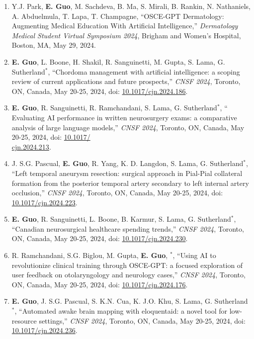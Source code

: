 \documentclass{article}
\begin{document}
\begin{enumerate}
    \item Y.J. Park, \textbf{E. Guo}, M. Sachdeva, B. Ma, S. Mirali, B. Rankin, N. Nathaniels, A. Abduelmula, T. Lapa, T. Champagne, ``OSCE-GPT Dermatology: Augmenting Medical Education With Artificial Intelligence,'' \textit{Dermatology Medical Student Virtual Symposium 2024}, Brigham and Women’s Hospital, Boston, MA, May 29, 2024.
    \item \textbf{E. Guo}, L. Boone, H. Shakil, R. Sanguinetti, M. Gupta, S. Lama, G. Sutherland$^*$, ``Chordoma management with artificial intelligence: a scoping review of current applications and future prospects,'' \textit{CNSF 2024}, Toronto, ON, Canada, May 20-25, 2024, doi: \href{https://doi.org/10.1017/cjn.2024.186}{10.1017/cjn.2024.186}.
    \item \textbf{E. Guo}, R. Sanguinetti, R. Ramchandani, S. Lama, G. Sutherland$^*$, ``
    Evaluating AI performance in written neurosurgery exams: a comparative analysis of large language models,'' \textit{CNSF 2024}, Toronto, ON, Canada, May 20-25, 2024, doi: \href{https://doi.org/10.1017/cjn.2024.213}{10.1017/\\cjn.2024.213}.
    \item J. S.G. Pascual, \textbf{E. Guo}, R. Yang, K. D. Langdon, S. Lama, G. Sutherland$^*$, ``Left temporal aneurysm resection: surgical approach in Pial-Pial collateral formation from the posterior temporal artery secondary to left internal artery occlusion,'' \textit{CNSF 2024}, Toronto, ON, Canada, May 20-25, 2024, doi: \href{https://doi.org/10.1017/cjn.2024.223}{10.1017/cjn.2024.223}.
    \item \textbf{E. Guo}, R. Sanguinetti, L. Boone, B. Karmur, S. Lama, G. Sutherland$^*$, ``Canadian neurosurgical healthcare spending trends,'' \textit{CNSF 2024}, Toronto, ON, Canada, May 20-25, 2024, doi: \href{https://doi.org/10.1017/cjn.2024.230}{10.1017/cjn.2024.230}.
    \item R. Ramchandani, S.G. Biglou, M. Gupta, \textbf{E. Guo}, $^*$, ``Using AI to revolutionize clinical training through OSCE-GPT: a focused exploration of user feedback on otolaryngology and neurology cases,'' \textit{CNSF 2024}, Toronto, ON, Canada, May 20-25, 2024, doi: \href{https://doi.org/10.1017/cjn.2024.176}{10.1017/cjn.2024.176}.
    \item \textbf{E. Guo}, J. S.G. Pascual, S. K.N. Cua, K. J.O. Khu, S. Lama, G. Sutherland$^*$, ``Automated awake brain mapping with eloquentaid: a novel tool for low-resource settings,'' \textit{CNSF 2024}, Toronto, ON, Canada, May 20-25, 2024, doi: \href{https://doi.org/10.1017/cjn.2024.236}{10.1017/cjn.2024.236}.

\end{enumerate}
\end{document}
